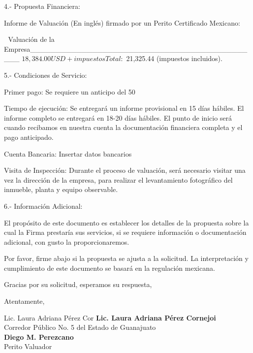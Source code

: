 \documentclass[5pt,letter]{report}
\begin{document}
4.- Propuesta Financiera:

Informe de Valuación (En inglés) firmado por un Perito Certificado Mexicano:

	Valuación de la Empresa_____________________________________________ $ 18,384.00 USD + impuestos
Total: $ 21,325.44 (impuestos incluidos).


5.- Condiciones de Servicio:

Primer pago: Se requiere un anticipo del 50%

Tiempo de ejecución: Se entregará un informe provisional en 15 días hábiles. El informe completo se entregará en 18-20 días hábiles. El punto de inicio será cuando recibamos en nuestra cuenta la documentación financiera completa y el pago anticipado.

Cuenta Bancaria: Insertar datos bancarios 

Visita de Inspección: Durante el proceso de valuación, será necesario visitar una vez la dirección de la empresa, para realizar el levantamiento fotográfico del inmueble, planta y equipo observable.

6.- Información Adicional:

El propósito de este documento es establecer los detalles de la propuesta sobre la cual la Firma prestaría sus servicios, si se requiere información o documentación adicional, con gusto la proporcionaremos.

Por favor, firme abajo si la propuesta se ajusta a la solicitud. La interpretación y cumplimiento de este documento se basará en la regulación mexicana.

Gracias por su solicitud, esperamos su respuesta,

Atentamente,

Lic. Laura Adriana Pérez Cor
\noindent
\textcolor{principal}{\textbf{Lic. Laura Adriana Pérez Cornejoi}}\\[1pt]
Corredor Público No. 5 del Estado de Guanajuato\\[5pt]
\noindent
\textcolor{principal}{\textbf{Diego M. Perezcano}}\\[1pt]
Perito Valuador
\end{document}
